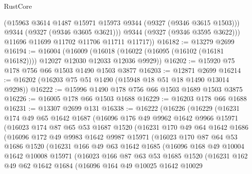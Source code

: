 \begin{lexlean}{RustCore}
\begin{coremodule}
            (@15963 @3614 @1487 @15971 @15973 @9344 (@9327 (@9346 @3615 @1503)))
            @9344
            (@9327 (@9346 @3605 @3621)))
          @9344
          (@9327 (@9346 @3595 @3622)))
        @11696
        @11699
        @11702
        @11706
        @11711
        @11717))
@16182 := @13279 @2699
@16194 := @16004
    (@16009 (@16018 (@16022 (@16095 (@16102 (@16181 @16182)))) @12027 @12030 @12033 @12036 @9929))
@16202 := @15920 @75 @178 @756 @66 @1503 @1490 @1503 @3877
@16203 := @12871 @2699
@16214 := @16202 (@16203 @75 @51 @1490 (@15948 @18 @51 @18 @1490 @13014 @9298))
@16222 := @15996 @1490 @178 @756 @66 @1503 @1689 @1503 @3875
@16226 := @16005 @178 @66 @1503 @1688
@16229 := @16203 @178 @66 @1688
@16231 := @13307 @2699 @131
@16338 := @16222
    (@16226
      (@16229
        (@16231
          @174
          @49
          @65
          @1642
          @1687
          (@16096
            @176
            @49
            @9962
            @1642
            @9966
            @15971
            (@16023
              @174
              @87
              @65
              @53
              @1687
              @1520
              (@16231
                @170
                @49
                @64
                @1642
                @1686
                (@16096
                  @172
                  @49
                  @9983
                  @1642
                  @9987
                  @15971
                  (@16023
                    @170
                    @87
                    @64
                    @53
                    @1686
                    @1520
                    (@16231
                      @166
                      @49
                      @63
                      @1642
                      @1685
                      (@16096
                        @168
                        @49
                        @10004
                        @1642
                        @10008
                        @15971
                        (@16023
                          @166
                          @87
                          @63
                          @53
                          @1685
                          @1520
                          (@16231
                            @162
                            @49
                            @62
                            @1642
                            @1684
                            (@16096
                              @164
                              @49
                              @10025
                              @1642
                              @10029

\end{coremodule}
\end{lexlean}
